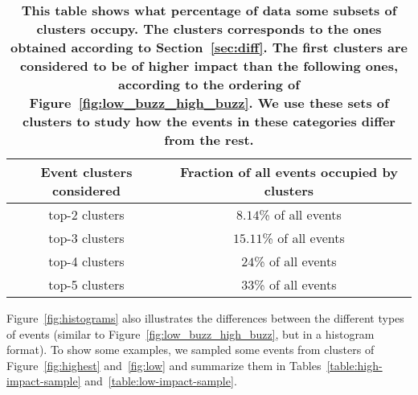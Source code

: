
\begin{table}
  \centering
  {\small
    \begin{tabular}{cc}
      \toprule
      Event clusters considered &  Fraction of all events occupied by clusters\\
      \midrule
      top-2 clusters &  $8.14$\% of all events\\
      top-3 clusters & $15.11$\% of all events \\
      top-4 clusters & $24$\% of all events \\
      top-5 clusters & $33$\% of all events \\
      \bottomrule
    \end{tabular}
  }
  \caption{\textbf{This table shows what percentage of data some
      subsets of clusters occupy. The clusters corresponds to the ones
      obtained according to Section~\ref{sec:diff}. The first clusters
      are considered to be of higher impact than the following ones,
      according to the ordering of Figure~\ref{fig:low_buzz_high_buzz}.
      We use these sets of clusters to study how the events in these
      categories differ from the rest.}} 
  \label{tab:threshold}
\end{table}


Figure~\ref{fig:histograms} also illustrates the differences between
the different types of events (similar to
Figure~\ref{fig:low_buzz_high_buzz}, but in a histogram format). To
show some examples, we sampled some events from clusters of
Figure~\ref{fig:highest} and~\ref{fig:low} and summarize them
in Tables~\ref{table:high-impact-sample}
and~\ref{table:low-impact-sample}.


